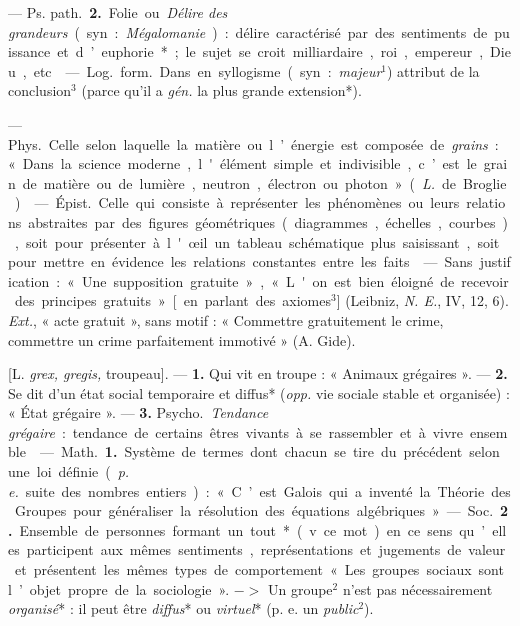 \begin{itemize}[leftmargin=1cm, label=, itemsep=1pt]
— \si{Ps. path.} {\bf 2.} Folie ou {\it Délire des grandeurs} (syn. :
{\it Mégalomanie}) : délire caractérisé par des sentiments de puissance et
d’euphorie* ; le sujet se croit milliardaire, roi, empereur, Dieu, etc.

 — \si{Log.} \si{form.} Dans en syllogisme (syn. :
{\it majeur}$^1$) attribut de la conclusion$^3$ (parce qu'il a {\it gén.}
la plus grande extension*).

 — \si{Phys.} Celle selon laquelle la matière ou
l’énergie est composée de {\it grains} : « Dans la science moderne,
l'élément simple et indivisible, c’est le grain de matière ou de lumière,
neutron, électron ou photon » ({\it L.} de Broglie).

 — \si{Épist.} Celle qui consiste à représenter les phénomènes ou leurs relations abstraites par des figures géométriques 
(diagrammes, échelles, courbes), soit pour présenter à l'œil un tableau
schématique plus saisissant, soit pour mettre en évidence les relations
constantes entre les faits.

 — Sans justification : « Une supposition gratuite », « L'on est
bien éloigné de recevoir des principes gratuits » [en parlant des axiomes$^3$]
(Leibniz, {\it N. E.}, IV, 12, 6). {\it Ext.}, « acte gratuit », sans motif :
« Commettre gratuitement le crime, commettre un crime parfaitement
immotivé » (A. Gide).

 [L. {\it grex, gregis,} troupeau]. — {\bf 1.} Qui vit en
troupe : « Animaux grégaires ». — {\bf 2.} Se dit d’un état social temporaire
et diffus* ({\it opp.} vie sociale stable et organisée) : « État grégaire ».
— {\bf 3.} \si{Psycho.} {\it Tendance grégaire} : tendance de certains êtres
vivants à se rassembler et à vivre ensemble.

 — \si{Math.} {\bf 1.} Système de termes dont chacun se tire du
précédent selon une loi définie ({\it p. e.} suite des nombres entiers) :
« C’est Galois qui a inventé la Théorie des Groupes pour généraliser la
résolution des équations algébriques. » — \si{Soc.} {\bf 2.} Ensemble de
personnes formant un tout* (v. ce mot) en ce sens qu’elles participent aux
mêmes sentiments, représentations et jugements de valeur et présentent les
mêmes types de comportement « Les groupes sociaux sont l’objet propre de la
sociologie ». $->$ Un groupe$^2$ n'est pas nécessairement {\it organisé}* :
il peut être {\it diffus}* ou {\it virtuel}* (p. e. un {\it public}$^2$).


\end{itemize}

